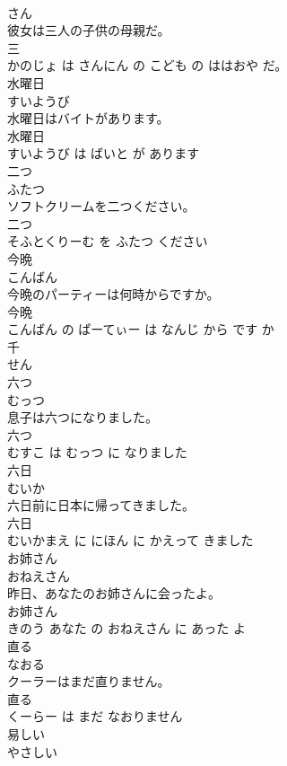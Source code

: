 \documentclass[8pt]{extreport}
\begin{document}
\begin{CJK}{UTF8}{min}
\\	さん			
\\	彼女は三人の子供の母親だ。	
\\	三 
\\	かのじょ は さんにん の こども の ははおや だ。			
\\	水曜日	
\\	すいようび			
\\	水曜日はバイトがあります。	
\\	水曜日 
\\	すいようび は ばいと が あります			
\\	二つ	
\\	ふたつ			
\\	ソフトクリームを二つください。	
\\	二つ 
\\	そふとくりーむ を ふたつ ください			
\\	今晩	
\\	こんばん			
\\	今晩のパーティーは何時からですか。	
\\	今晩 
\\	こんばん の ぱーてぃー は なんじ から です か			
\\	千	
\\	せん			
\\	六つ	
\\	むっつ			
\\	息子は六つになりました。	
\\	六つ 
\\	むすこ は むっつ に なりました			
\\	六日	
\\	むいか			
\\	六日前に日本に帰ってきました。	
\\	六日 
\\	むいかまえ に にほん に かえって きました			
\\	お姉さん	
\\	おねえさん			
\\	昨日、あなたのお姉さんに会ったよ。	
\\	お姉さん 
\\	きのう あなた の おねえさん に あった よ			
\\	直る	
\\	なおる			
\\	クーラーはまだ直りません。	
\\	直る 
\\	くーらー は まだ なおりません			
\\	易しい	
\\	やさしい			

\end{CJK}
\end{document}
